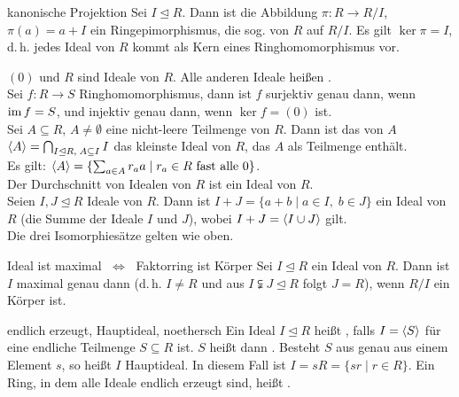 \begin{Lemma}{kanonische Projektion}
    Sei $I \trianglelefteq R$.
    Dann ist die Abbildung $\pi: R \rightarrow R/I$, $\pi(a) = a + I$
    ein Ringepimorphismus, die sog. 
    von $R$ auf $R/I$.
    Es gilt $\ker \pi = I$, d.\,h. jedes Ideal von $R$ kommt als Kern
    eines Ringhomomorphismus vor.
\end{Lemma}

\begin{Bem}
    $(0)$ und $R$ sind Ideale von $R$.
    Alle anderen Ideale heißen . \\
    Sei $f: R \rightarrow S$ Ringhomomorphismus, dann ist $f$ surjektiv
    genau dann, wenn $\operatorname{im} f = S$, und injektiv genau dann,
    wenn $\ker f = (0)$ ist. \\
    Sei $A \subseteq R$, $A \not= \emptyset$ eine nicht-leere Teilmenge
    von $R$.
    Dann ist das von $A$ 
    $\langle A \rangle = \bigcap_{I \trianglelefteq R,\; A \subseteq I} I$ das
    kleinste Ideal von $R$, das $A$ als Teilmenge enthält. \\
    Es gilt: $\langle A \rangle = \{\sum_{a \in A} r_a a \;|\;
    r_a \in R \text{ fast alle } 0\}$. \\
    Der Durchschnitt von Idealen von $R$ ist ein Ideal von $R$. \\
    Seien $I, J \trianglelefteq R$ Ideale von $R$.
    Dann ist $I + J = \{a + b \;|\; a \in I,\; b \in J\}$ ein Ideal
    von $R$ (die Summe der Ideale $I$ und $J$), wobei
    $I + J = \langle I \cup J \rangle$ gilt. \\
    Die drei Isomorphiesätze gelten wie oben.
\end{Bem}

\begin{Satz}{Ideal ist maximal $\;\Leftrightarrow\;$ Faktorring ist Körper}
    Sei $I \trianglelefteq R$ ein Ideal von $R$.
    Dann ist $I$ maximal genau dann
    (d.\,h. $I \not= R$ und aus
    $I \subsetneqq J \trianglelefteq R$ folgt $J = R$),
    wenn $R/I$ ein Körper ist.
\end{Satz}

\begin{Def}{endlich erzeugt, Hauptideal, noethersch}
    Ein Ideal $I \trianglelefteq R$ heißt ,
    falls $I = \langle S \rangle$ für eine endliche Teilmenge $S \subseteq R$ ist.
    $S$ heißt dann .
    Besteht $S$ aus genau aus einem Element $s$, so heißt $I$ Hauptideal.
    In diesem Fall ist $I = sR = \{sr \;|\; r \in R\}$.
    Ein Ring, in dem alle Ideale endlich erzeugt sind, heißt
    .
\end{Def}

